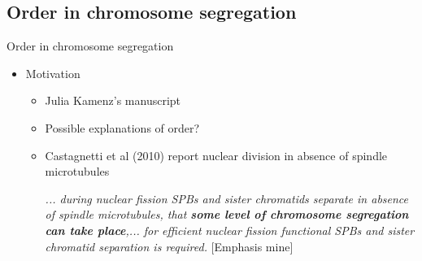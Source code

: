\subsection{Order in chromosome segregation}
\begin{frame}[allowframebreaks]{Order in chromosome segregation}
\begin{itemize}
	\item Motivation 
		\begin{itemize}
			\item Julia Kamenz's manuscript \cite{JulKam2015}
			\item Possible explanations of order?
			\item Castagnetti et al (2010) report nuclear division in absence of spindle microtubules \cite{Casta2010}

\emph{... during nuclear fission SPBs and sister chromatids separate in absence of spindle microtubules, that {\bf some level of chromosome segregation can take place},... for efficient nuclear fission functional SPBs and sister chromatid separation is required.} [Emphasis mine]
		\end{itemize}
\end{itemize}
\end{frame}
